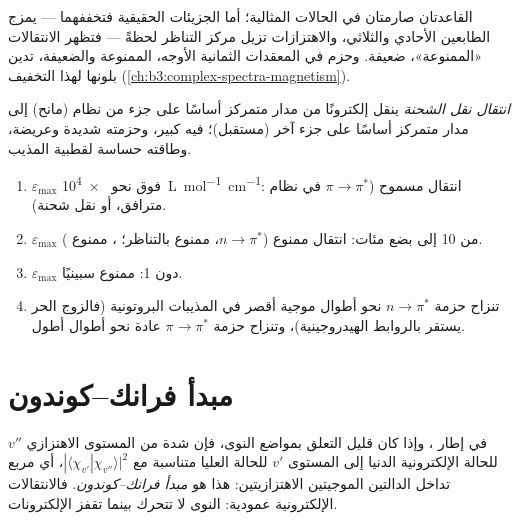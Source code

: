 القاعدتان صارمتان في الحالات المثالية؛ أما الجزيئات الحقيقية فتخففهما
---  يمزج الطابعين الأحادي والثلاثي، والاهتزازات
تزيل مركز التناظر لحظةً --- فتظهر الانتقالات «الممنوعة»،
ضعيفة. وحزم  في المعقدات الثمانية الأوجه، الممنوعة 
والضعيفة، تدين بلونها لهذا التخفيف
(\cref{ch:b3:complex-spectra-magnetism}).

\begin{definition}\label{def:b3:electronic-spectroscopy:charge-transfer}
\emph{انتقال نقل الشحنة} ينقل
إلكترونًا من مدار متمركز أساسًا على جزء من نظام (مانح) إلى
مدار متمركز أساسًا على جزء آخر (مستقبل)؛  فيه
كبير، وحزمته شديدة وعريضة، وطاقته حساسة لقطبية
المذيب.
\end{definition}

\begin{method}\label{met:b3:electronic-spectroscopy:assign-band}
\begin{enumerate}
  \item $\varepsilon_{\max}$ فوق نحو \qty{e4}{L.mol^{-1}.cm^{-1}}: انتقال
        مسموح ($\pi\to\pi^*$ في نظام مترافق، أو نقل شحنة).
  \item $\varepsilon_{\max}$ من 10 إلى بضع مئات: انتقال ممنوع ($n\to\pi^*$،
        ممنوع بالتناظر؛ ، ممنوع ).
  \item $\varepsilon_{\max}$ دون 1: ممنوع سبينيًا.
  \item تنزاح حزمة $n\to\pi^*$ نحو أطوال موجية أقصر في المذيبات البروتونية
        (فالزوج الحر يستقر بالروابط الهيدروجينية)، وتنزاح حزمة $\pi\to\pi^*$
        عادة نحو أطوال أطول.
\end{enumerate}
\end{method}

\section{مبدأ فرانك--كوندون}

\begin{theorem}\label{thm:b3:electronic-spectroscopy:franck-condon}
في إطار ، وإذا كان 
قليل التعلق بمواضع النوى، فإن شدة 
من المستوى الاهتزازي $v''$ للحالة الإلكترونية الدنيا إلى المستوى
$v'$ للحالة العليا متناسبة مع $|\langle\chi_{v'}|\chi_{v''}\rangle|^2$، أي
مربع تداخل الدالتين الموجيتين الاهتزازيتين: هذا هو
\emph{مبدأ فرانك--كوندون}. فالانتقالات
الإلكترونية عمودية: النوى لا تتحرك بينما تقفز الإلكترونات.
\end{theorem}

